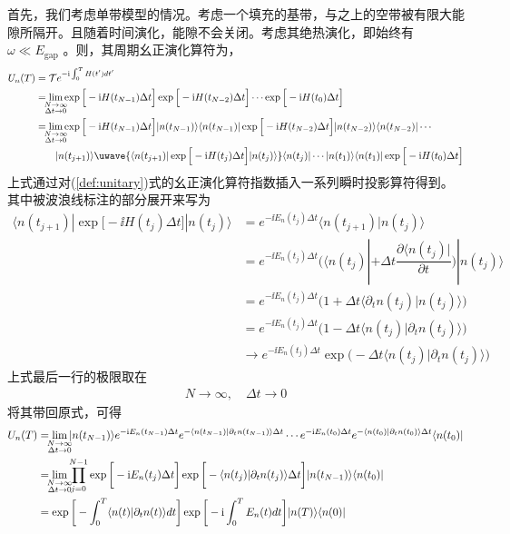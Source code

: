 首先，我们考虑单带模型的情况。考虑一个填充的基带，与之上的空带被有限大能隙所隔开。且随着时间演化，能隙不会关闭。考虑其绝热演化，即始终有 $\omega\ll E_{\text{gap}}$ 。则，其周期幺正演化算符为，
\begin{align}
U_n(T)&=\mathcal{T}e^{-\ii\int_{0}^T H(t')dt'}\\
&= \lim_{\mathclap{\substack{N\rightarrow\infty\\\Delta t\rightarrow0}}}\exp\Big[-\ii H(t_{N-1})\Delta t\Big]\exp\Big[-\ii H(t_{N-2})\Delta t\Big]\cdots\exp\Big[-\ii H(t_0)\Delta t\Big]\\
&= \lim_{\mathclap{\substack{N\rightarrow\infty\\\Delta t\rightarrow0}}}\exp\Big[-\ii H(t_{N-1})\Delta t\Big]|n(t_{N-1})\rangle\langle n(t_{N-1})|\exp\Big[-\ii H(t_{N-2})\Delta t\Big]|n(t_{N-2})\rangle\langle n(t_{N-2})|\cdots\\
&\qquad|n(t_{j+1})\rangle\uwave{\langle n(t_{j+1})|\exp\Big[-\ii H(t_j)\Delta t\Big]|n(t_{j})\rangle}\langle n(t_{j})|\cdots|n(t_{1})\rangle\langle n(t_{1})|\exp\Big[-\ii H(t_0)\Delta t\Big]
\end{align}
上式通过对(\ref{def:unitary})式的幺正演化算符指数插入一系列瞬时投影算符得到。其中被波浪线标注的部分展开来写为
\begin{align}
\langle n(t_{j+1})|\exp\Big[-\ii H(t_j)\Delta t\Big]|n(t_{j})\rangle
&= e^{-\ii E_n(t_j)\Delta t}\langle n(t_{j+1})|n(t_j)\rangle\\
&= e^{-\ii E_n(t_j)\Delta t}\bigg(\langle n(t_{j})|+\Delta t\dfrac{\partial\langle n(t_j)|}{\partial t}\bigg)|n(t_j)\rangle\\
&= e^{-\ii E_n(t_j)\Delta t}\bigg(1+\Delta t\langle\partial_t n(t_j)|n(t_j)\rangle\bigg)\\
&= e^{-\ii E_n(t_j)\Delta t}\bigg(1-\Delta t\langle n(t_j)|\partial_tn(t_j)\rangle\bigg)\\
&\rightarrow e^{-\ii E_n(t_j)\Delta t}\exp\bigg(-\Delta t\langle n(t_j)|\partial_tn(t_j)\rangle\bigg)
\end{align}
上式最后一行的极限取在
\begin{align}
N\rightarrow\infty, \quad\Delta t\rightarrow0
\end{align}
将其带回原式，可得
\begin{align}
U_n(T)&=\lim_{\mathclap{\substack{N\rightarrow\infty\\\Delta t\rightarrow0}}}|n(t_{N-1})\rangle e^{-\ii E_n(t_{N-1})\Delta t}e^{-\langle n(t_{N-1})|\partial_tn(t_{N-1})\rangle\Delta t}\cdots e^{-\ii E_n(t_0)\Delta t}e^{-\langle n(t_0)|\partial_tn(t_0)\rangle\Delta t}\langle n(t_0)|\\
&= \lim_{\mathclap{\substack{N\rightarrow\infty\\\Delta t\rightarrow0}}}\prod_{j=0}^{N-1}\exp\bigg[-\ii E_n(t_j)\Delta t\bigg]\exp\bigg[-\langle n(t_j)|\partial_tn(t_j)\rangle\Delta t\bigg]|n(t_{N-1})\rangle\langle n(t_0)|\\
&= \exp\bigg[-\int_0^T\langle n(t)|\partial_tn(t)\rangle dt\bigg]\exp\bigg[-\ii\int_0^TE_n(t)dt\bigg]|n(T)\rangle\langle n(0)|
\label{eq:ut-adiab-single-details}
\end{align}

